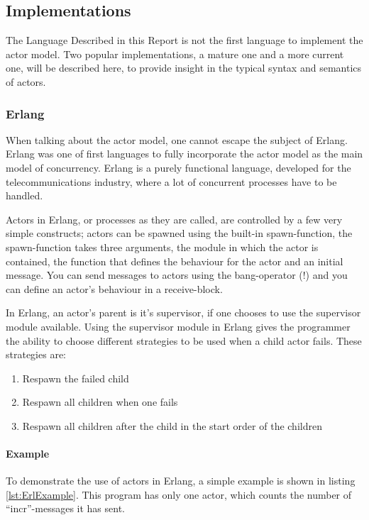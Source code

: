 \subsection{Implementations}\label{sub:implementations}
The Language Described in this Report is not the first language to implement the actor model. Two popular implementations, a mature one and a more current one, will be described here, to provide insight in the typical syntax and semantics of actors.

\subsubsection{Erlang}
When talking about the actor model, one cannot escape the subject of Erlang. Erlang was one of first languages to fully incorporate the actor model as the main model of concurrency. Erlang is a purely functional language, developed for the telecommunications industry, where a lot of concurrent processes have to be handled. 

Actors in Erlang, or processes as they are called, are controlled by a few very simple constructs; actors can be spawned using the built-in spawn-function, the spawn-function takes three arguments, the module in which the actor is contained, the function that defines the behaviour for the actor and an initial message. You can send messages to actors using the bang-operator (!) and you can define an actor's behaviour in a receive-block.

In Erlang, an actor's parent is it's supervisor, if one chooses to use the supervisor module available. Using the supervisor module in Erlang gives the programmer the ability to choose different strategies to be used when a child actor fails. These strategies are:
\begin{enumerate}
  \item Respawn the failed child
  \item Respawn all children when one fails
  \item Respawn all children after the child in the start order of the children
\end{enumerate}

\paragraph{Example}
To demonstrate the use of actors in Erlang, a simple example is shown in listing \ref{lst:ErlExample}. This program has only one actor, which counts the number of \enquote{incr}-messages it has sent.

